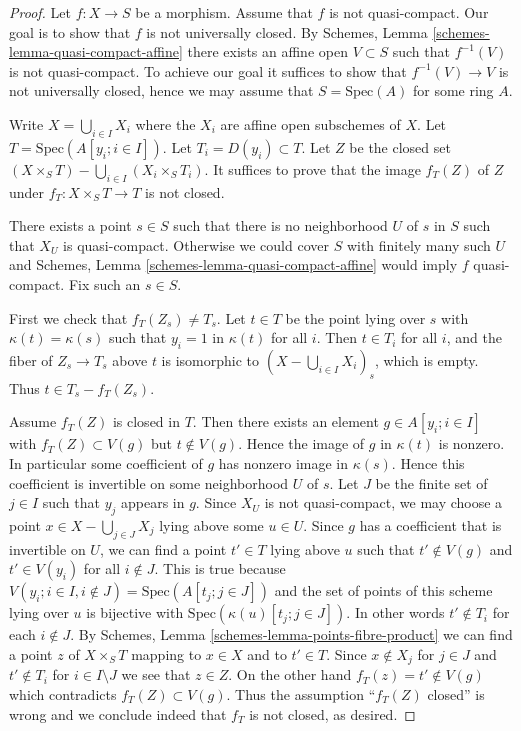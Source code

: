 \begin{proof}
Let $f : X \to S$ be a morphism. Assume that $f$ is not quasi-compact.
Our goal is to show that $f$ is not universally closed. By
Schemes, Lemma \ref{schemes-lemma-quasi-compact-affine}
there exists an affine open $V \subset S$ such that $f^{-1}(V)$ is
not quasi-compact. To achieve our goal it suffices to show that
$f^{-1}(V) \to V$ is not universally closed, hence we may assume that
$S = \text{Spec}(A)$ for some ring $A$.

\medskip\noindent
Write $X = \bigcup_{i \in I} X_i$ where the $X_i$ are affine open subschemes
of $X$.  Let $T = \text{Spec}(A[y_i ; i \in I])$.
Let $T_i = D(y_i) \subset T$. Let $Z$ be the closed set
$(X \times_S T) - \bigcup_{i \in I} (X_i \times_S T_i)$.  It suffices to
prove that the image $f_T(Z)$ of $Z$ under $f_T : X \times_S T \to T$
is not closed.

\medskip\noindent
There exists a point $s \in S$ such that there is no
neighborhood $U$ of $s$ in $S$ such that $X_U$ is quasi-compact.
Otherwise we could cover $S$ with finitely many such $U$ and
Schemes, Lemma \ref{schemes-lemma-quasi-compact-affine}
would imply $f$ quasi-compact. Fix such an $s \in S$.

\medskip\noindent
First we check that $f_T(Z_s) \ne T_s$.  Let $t \in T$ be the point
lying over $s$ with $\kappa(t) = \kappa(s)$ such that $y_i = 1$ in
$\kappa(t)$ for all $i$.
Then $t \in T_i$ for all $i$, and the fiber of $Z_s \to T_s$ above
$t$ is isomorphic to $(X - \bigcup_{i \in I} X_i)_s$, which is empty.
Thus $t \in T_s - f_T(Z_s)$.

\medskip\noindent
Assume $f_T(Z)$ is closed in $T$. Then there exists an element
$g \in A[y_i; i \in I]$ with $f_T(Z) \subset V(g)$ but $t \not \in V(g)$.
Hence the image of $g$ in $\kappa(t)$ is nonzero. In particular some
coefficient of $g$ has nonzero image in $\kappa(s)$. Hence this coefficient is
invertible on some neighborhood $U$ of $s$. Let $J$ be the finite set of
$j \in I$ such that $y_j$ appears in $g$. Since $X_U$ is not quasi-compact,
we may choose a point $x \in X - \bigcup_{j \in J} X_j$ lying above some
$u \in U$. Since $g$ has a coefficient that is invertible on $U$, we can
find a point $t' \in T$ lying above $u$ such that $t' \not \in V(g)$ and
$t' \in V(y_i)$ for all $i \notin J$. This is true because
$V(y_i; i \in I, i \not\in J) = \text{Spec}(A[t_j; j\in J])$
and the set of points of this scheme lying over $u$ is bijective
with $\text{Spec}(\kappa(u)[t_j; j \in J])$. In other words $t' \notin T_i$
for each $i \notin J$. By
Schemes, Lemma \ref{schemes-lemma-points-fibre-product}
we can find a point $z$ of $X \times_S T$ mapping to $x \in X$ and to
$t' \in T$. Since $x \not \in X_j$ for $j \in J$ and $t' \not \in T_i$
for $i \in I \setminus J$ we see that $z \in Z$. On the other hand
$f_T(z) = t' \not \in V(g)$ which contradicts $f_T(Z) \subset V(g)$.
Thus the assumption ``$f_T(Z)$ closed'' is wrong and we conclude indeed
that $f_T$ is not closed, as desired.
\end{proof}



